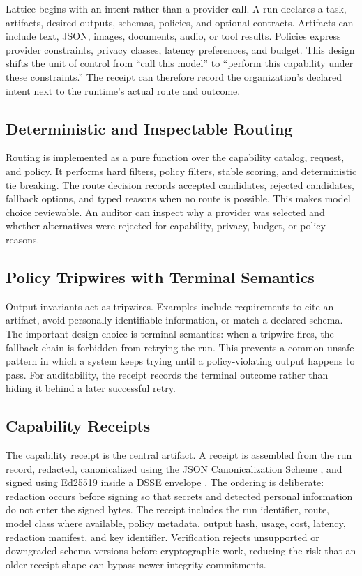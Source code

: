 \documentclass[conference]{IEEEtran}
\begin{document}
Lattice begins with an intent rather than a provider call. A run declares a task,
artifacts, desired outputs, schemas, policies, and optional contracts. Artifacts
can include text, JSON, images, documents, audio, or tool results. Policies
express provider constraints, privacy classes, latency preferences, and budget.
This design shifts the unit of control from ``call this model'' to ``perform
this capability under these constraints.'' The receipt can therefore record the
organization's declared intent next to the runtime's actual route and outcome.

\subsection{Deterministic and Inspectable Routing}

Routing is implemented as a pure function over the capability catalog, request,
and policy. It performs hard filters, policy filters, stable scoring, and
deterministic tie breaking. The route decision records accepted candidates,
rejected candidates, fallback options, and typed reasons when no route is
possible. This makes model choice reviewable. An auditor can inspect why a
provider was selected and whether alternatives were rejected for capability,
privacy, budget, or policy reasons.

\subsection{Policy Tripwires with Terminal Semantics}

Output invariants act as tripwires. Examples include requirements to cite an
artifact, avoid personally identifiable information, or match a declared schema.
The important design choice is terminal semantics: when a tripwire fires, the
fallback chain is forbidden from retrying the run. This prevents a common unsafe
pattern in which a system keeps trying until a policy-violating output happens
to pass. For auditability, the receipt records the terminal outcome rather than
hiding it behind a later successful retry.

\subsection{Capability Receipts}

The capability receipt is the central artifact. A receipt is assembled from the
run record, redacted, canonicalized using the JSON Canonicalization Scheme
\cite{rfc8785}, and signed using Ed25519 \cite{rfc8032} inside a DSSE envelope
\cite{dsse}. The ordering is deliberate: redaction occurs before signing so
that secrets and detected personal information do not enter the signed bytes.
The receipt includes the run identifier, route, model class where available,
policy metadata, output hash, usage, cost, latency, redaction manifest, and key
identifier. Verification rejects unsupported or downgraded schema versions
before cryptographic work, reducing the risk that an older receipt shape can
bypass newer integrity commitments.
\end{document}
